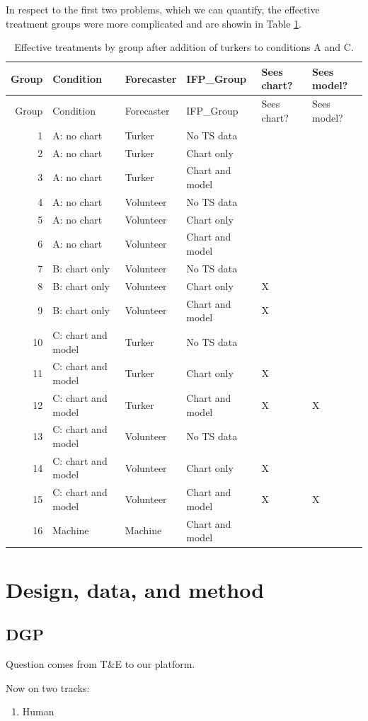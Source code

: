 \documentclass[]{article}
\providecommand{\tightlist}{%
  \setlength{\itemsep}{0pt}\setlength{\parskip}{0pt}}
\begin{document}
In respect to the first two problems, which we can quantify, the
effective treatment groups were more complicated and are showin in Table
\ref{tab:all-conditions}.

\begin{longtable}[]{@{}rlllll@{}}
\caption{Effective treatments by group after addition of turkers to
conditions A and C. \label{tab:all-conditions}}\tabularnewline
\toprule
Group & Condition & Forecaster & IFP\_Group & Sees chart? & Sees
model?\tabularnewline
\midrule
\endfirsthead
\toprule
Group & Condition & Forecaster & IFP\_Group & Sees chart? & Sees
model?\tabularnewline
\midrule
\endhead
1 & A: no chart & Turker & No TS data & &\tabularnewline
2 & A: no chart & Turker & Chart only & &\tabularnewline
3 & A: no chart & Turker & Chart and model & &\tabularnewline
4 & A: no chart & Volunteer & No TS data & &\tabularnewline
5 & A: no chart & Volunteer & Chart only & &\tabularnewline
6 & A: no chart & Volunteer & Chart and model & &\tabularnewline
7 & B: chart only & Volunteer & No TS data & &\tabularnewline
8 & B: chart only & Volunteer & Chart only & X &\tabularnewline
9 & B: chart only & Volunteer & Chart and model & X &\tabularnewline
10 & C: chart and model & Turker & No TS data & &\tabularnewline
11 & C: chart and model & Turker & Chart only & X &\tabularnewline
12 & C: chart and model & Turker & Chart and model & X &
X\tabularnewline
13 & C: chart and model & Volunteer & No TS data & &\tabularnewline
14 & C: chart and model & Volunteer & Chart only & X &\tabularnewline
15 & C: chart and model & Volunteer & Chart and model & X &
X\tabularnewline
16 & Machine & Machine & Chart and model & &\tabularnewline
\bottomrule
\end{longtable}

\section{Design, data, and method}\label{design-data-and-method}

\subsection{DGP}\label{dgp}

Question comes from T\&E to our platform.

Now on two tracks:

\begin{enumerate}
\def\labelenumi{\arabic{enumi}.}
\tightlist
\item
  Human
\end{enumerate}
\end{document}
